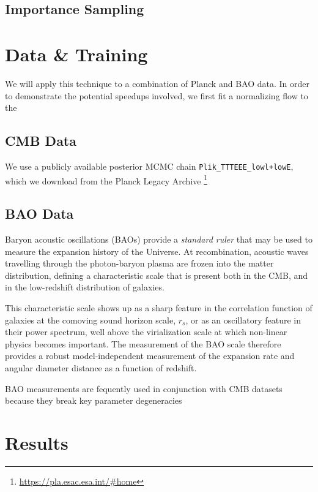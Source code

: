 \documentclass[fleqn,usenatbib]{mnras}
\begin{document}
\subsection{Importance Sampling}
\label{sec:importance_sampling}



\section{Data \& Training}
\label{sec:data}
We will apply this technique to a combination of Planck and BAO data. In order to demonstrate the potential speedups involved, we first fit a normalizing flow to the 

\subsection{CMB Data}


We use a publicly available posterior MCMC chain {\tt Plik\_TTTEEE\_lowl+lowE}, which we download from the Planck Legacy Archive \footnote{\url{https://pla.esac.esa.int/#home}}

\subsection{BAO Data}
\label{sec:bao_data}

Baryon acoustic oscillations (BAOs) provide a \emph{standard ruler} that may be used to measure the expansion history of the Universe. At recombination, acoustic waves travelling through the photon-baryon plasma are frozen into the matter distribution, defining a characteristic scale that is present both in the CMB, and in the low-redshift distribution of galaxies. 

This characteristic scale shows up as a sharp feature in the correlation function of galaxies at the comoving sound horizon scale, $r_s$, or as an oscillatory feature in their power spectrum, well above the virialization scale at which non-linear physics becomes important. The measurement of the BAO scale therefore provides a robust model-independent measurement of the expansion rate and angular diameter distance as a function of redshift. 

BAO measurements are fequently used in conjunction with CMB datasets because they break key parameter degeneracies 

\section{Results}
\label{sec:results}
\end{document}
